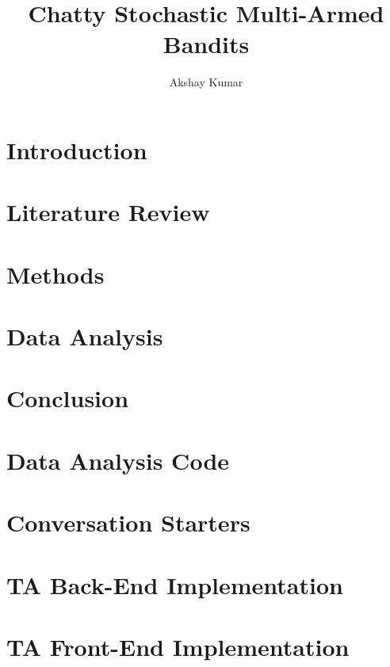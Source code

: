 \documentclass[12pt,lot,lof]{puthesis_undergraduate}
\title{Chatty Stochastic Multi-Armed Bandits}
\author{Akshay Kumar}
\begin{document}
\chapter{Introduction}
\label{ch:Introduction} 


\chapter{Literature Review}
\label{ch:LiteratureReview}


\chapter{Methods}
\label{ch:Methods}


\chapter{Data Analysis}
\label{ch:DataAnalysis}


\chapter{Conclusion}
\label{ch:Conclusion}


\appendix
\chapter{Data Analysis Code}
\label{app:DataAnalysisCode}


\appendix
\chapter{Conversation Starters}
\label{app:ConversationStarters}


\appendix
\chapter{TA Back-End Implementation}
\label{app:TABackendImplementation}


\appendix
\chapter{TA Front-End Implementation}
\label{app:TAFrontendImplementation}




\end{document}
